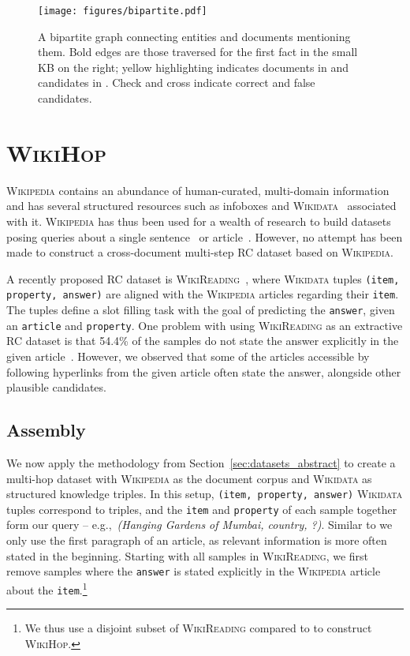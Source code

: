 \documentclass[11pt,letterpaper]{article}
\newcommand{\WikiHop}{\textsc{WikiHop}\xspace}
\newcommand{\WikiReadingUnseen}{54.4\%\xspace}
\newcommand{\WikiReading}{\textsc{WikiReading}\xspace}
\newcommand{\Wikidata}{\textsc{Wikidata}\xspace}
\newcommand{\Wikipedia}{\textsc{Wikipedia}\xspace}
\begin{document}
\begin{figure}[t]
    \centering
    \texttt{[image: figures/bipartite.pdf]}
    \caption{
        A bipartite graph connecting entities and documents mentioning them.
Bold edges are those traversed for the first fact in the small KB on the right; 
yellow highlighting indicates documents in  and candidates in .
Check and cross indicate correct and false candidates.
    }
    \label{fig:bipartite}
\end{figure}

\section{\WikiHop}\label{sec:wikihop}
\Wikipedia contains an abundance of human-curated, multi-domain information and has several structured resources such as infoboxes and \Wikidata~\cite{vrandecic2012wikidata} associated with it.
\Wikipedia has thus been used for a wealth of research to build datasets posing queries about a single sentence~\cite{morales2016learning,levy2017zeroshot} or article~\cite{Yang2015_WikiQA,hewlett2016_wikireading,Rajpurkar2016_SQUAD}.
However, no attempt has been made to construct a cross-document multi-step RC dataset based on \Wikipedia.


A recently proposed RC dataset is \WikiReading~\cite{hewlett2016_wikireading}, where \Wikidata tuples {\smaller \texttt{(item, property, answer)}} are aligned with the \Wikipedia articles regarding their {\smaller \texttt{item}}.
The tuples define a slot filling task with the goal of predicting the {\smaller \texttt{answer}}, given an {\smaller \texttt{article}} and {\smaller \texttt{property}}.
One problem with using \WikiReading as an extractive RC dataset is that \WikiReadingUnseen of the samples do not state the answer explicitly in the given article~\cite{hewlett2016_wikireading}.
However, we observed that some of the articles accessible by following hyperlinks from the given article often state the answer, alongside other plausible candidates.

\subsection{Assembly}
We now apply the methodology from Section~\ref{sec:datasets_abstract} to create a multi-hop dataset with \Wikipedia as the document corpus and \Wikidata as structured knowledge triples.
In this setup, {\smaller \texttt{(item, property, answer)}} \Wikidata tuples correspond to  triples, and the {\smaller \texttt{item}} and {\smaller \texttt{property}} of each sample together form our query  -- e.g.,\ \emph{(Hanging Gardens of Mumbai, country, ?)}. 
Similar to  we only use the first paragraph of an article, as relevant information is more often stated in the beginning.
Starting with all samples in \WikiReading, we first remove samples where the {\smaller \texttt{answer}} is stated explicitly in the \Wikipedia article about the {\smaller \texttt{item}}.\footnote{
    We thus use a disjoint subset of \WikiReading compared to  to construct \WikiHop.
}
\end{document}
